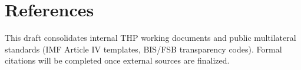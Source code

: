 \section{References}
This draft consolidates internal THP working documents and public multilateral standards (IMF Article IV templates, BIS/FSB transparency codes). Formal citations will be completed once external sources are finalized.
